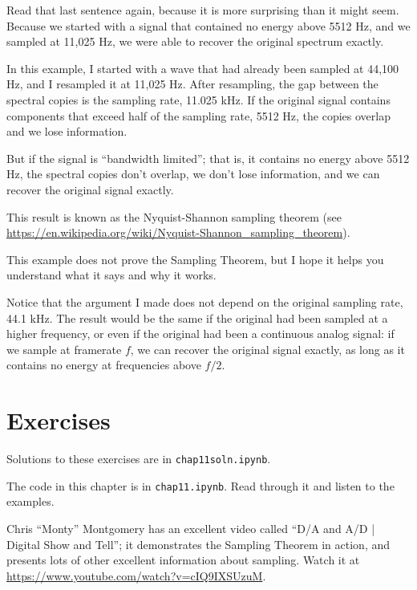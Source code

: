 \documentclass[12pt]{book}
\begin{document}
Read that last sentence again, because it is more surprising than it
might seem.  Because we started with a signal that contained no energy
above 5512 Hz, and we sampled at 11,025 Hz, we were able to recover
the original spectrum exactly.

In this example, I started with a wave that had already been
sampled at 44,100 Hz, and I resampled it at 11,025 Hz.  After
resampling, the gap between the spectral copies is the sampling
rate, 11.025 kHz.  If the original signal contains components that
exceed half of the sampling rate, 5512 Hz, the copies overlap
and we lose information.

But if the signal is ``bandwidth limited''; that is, it contains no
energy above 5512 Hz, the spectral copies don't overlap, we don't lose
information, and we can recover the original signal exactly.

This result is known as the Nyquist-Shannon sampling theorem (see
\url{https://en.wikipedia.org/wiki/Nyquist-Shannon_sampling_theorem}).

This example does not prove the Sampling Theorem, but I hope it
helps you understand what it says and why it works.

Notice that the argument I made does
not depend on the original sampling rate, 44.1 kHz.  The result
would be the same if the original had been sampled at a higher
frequency, or even if the original had been a continuous analog
signal: if we sample at framerate $f$, we can recover the original
signal exactly, as long as it contains no energy at frequencies
above $f/2$.


\section{Exercises}

Solutions to these exercises are in {\tt chap11soln.ipynb}.

\begin{exercise}
The code in this chapter is in {\tt chap11.ipynb}.  Read through
it and listen to the examples.
\end{exercise}


\begin{exercise}
Chris ``Monty'' Montgomery has an excellent video called ``D/A and A/D
| Digital Show and Tell''; it demonstrates the Sampling Theorem in
action, and presents lots of other excellent information about
sampling.  Watch it at
\url{https://www.youtube.com/watch?v=cIQ9IXSUzuM}.
\end{exercise}
\end{document}
